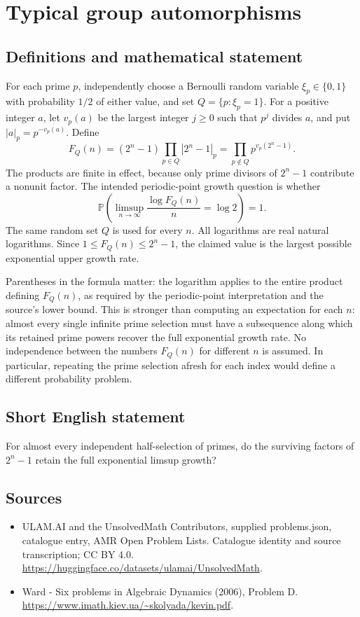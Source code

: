 \documentclass[11pt,a4paper]{article}
\begin{document}
\section*{Typical group automorphisms}\label{statement}

\subsection{Definitions and mathematical statement}
For each prime $p$, independently choose a Bernoulli random variable
$\xi_p\in\{0,1\}$ with probability $1/2$ of either value, and set
$Q=\{p:\xi_p=1\}$. For a positive integer $a$, let $v_p(a)$ be the
largest integer $j\ge0$ such that $p^j$ divides $a$, and put
$|a|_p=p^{-v_p(a)}$. Define
\[
 F_Q(n)=(2^n-1)\prod_{p\in Q}|2^n-1|_p
       =\prod_{p\notin Q}p^{v_p(2^n-1)}.
\]
The products are finite in effect, because only prime divisors of
$2^n-1$ contribute a nonunit factor. The intended periodic-point growth
question is whether
\[
 \mathbb P\!\left(\limsup_{n\to\infty}\frac{\log F_Q(n)}{n}
                      =\log2\right)=1.
\]
The same random set $Q$ is used for every $n$. All logarithms are real
natural logarithms. Since $1\le F_Q(n)\le2^n-1$, the claimed value is the
largest possible exponential upper growth rate.

Parentheses in the formula matter: the logarithm applies to the entire
product defining $F_Q(n)$, as required by the periodic-point interpretation
and the source's lower bound. This is stronger than computing an
expectation for each $n$: almost every single infinite prime selection
must have a subsequence along which its retained prime powers recover
the full exponential growth rate. No independence between the numbers
$F_Q(n)$ for different $n$ is assumed. In particular, repeating the prime
selection afresh for each index would define a different probability problem.
\subsection{Short English statement}
For almost every independent half-selection of primes, do the surviving factors of $2^n-1$ retain the full exponential limsup growth?
\subsection{Sources}
\begin{itemize}
\item[S1] ULAM.AI and the UnsolvedMath Contributors, supplied problems.json, catalogue entry, AMR Open Problem Lists. Catalogue identity and source transcription; CC BY 4.0.
\url{https://huggingface.co/datasets/ulamai/UnsolvedMath}.
\item[S2] Ward - Six problems in Algebraic Dynamics (2006), Problem D. 
\url{https://www.imath.kiev.ua/~skolyada/kevin.pdf}.
\end{itemize}
\end{document}
